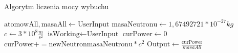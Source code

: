 \noindent
\begin{algorithm}
\caption{Algorytm liczenia mocy wybuchu}
\begin{algorithmic}[1]
\State $\text{atomowAll}, \text{masaAll} \gets \text{UserInput}$
\State $\text{masaNeutronu}\gets 1,67492721*10^{-27} kg$
\State $c\gets 3*10^8 \frac{m}{s^2}$
\State $\text{isWorking}\gets \text{UserInput}$
\State $\text{curPower} \gets 0$
    \State $\text{curPower} += \text{newNeutron}\text{masaNeutronu}*c^2 $
    \State $\text{Output}\gets \frac{\text{curPower}}{masaAll}$
\EndWhile

\EndProcedure

\end{algorithmic}
\end{algorithm}